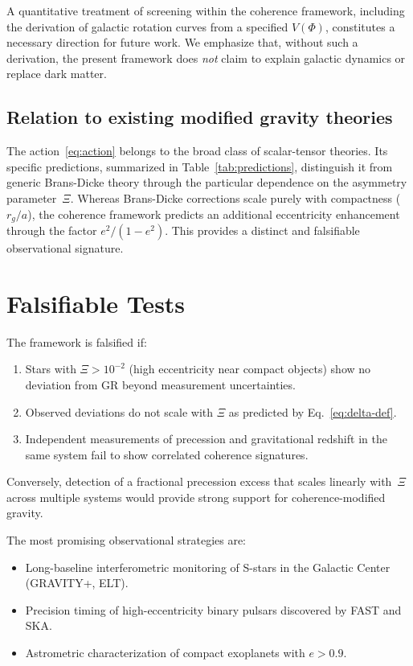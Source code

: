 \documentclass[showpacs,preprintnumbers,amsmath,amssymb,prd,longbibliography]{revtex4-2}
\begin{document}
A quantitative treatment of screening within the coherence
framework, including the derivation of galactic rotation
curves from a specified $V(\Phi)$, constitutes a necessary
direction for future work.
We emphasize that, without such a derivation, the present
framework does \emph{not} claim to explain galactic dynamics
or replace dark matter.

\subsection{Relation to existing modified gravity theories}

The action~\eqref{eq:action} belongs to the broad class
of scalar-tensor theories.
Its specific predictions, summarized in
Table~\ref{tab:predictions}, distinguish it from generic
Brans-Dicke theory through the particular dependence on the
asymmetry parameter~$\Xi$.
Whereas Brans-Dicke corrections scale purely with compactness
($r_g/a$), the coherence framework predicts an
additional eccentricity enhancement through the factor
$e^2/(1-e^2)$.
This provides a distinct and falsifiable observational signature.

\section{Falsifiable Tests}
\label{sec:falsification}

The framework is falsified if:
\begin{enumerate}
\item Stars with $\Xi > 10^{-2}$ (high eccentricity near
compact objects) show no deviation from GR beyond
measurement uncertainties.
\item Observed deviations do not scale with $\Xi$ as predicted
by Eq.~\eqref{eq:delta-def}.
\item Independent measurements of precession and gravitational
redshift in the same system fail to show correlated
coherence signatures.
\end{enumerate}

Conversely, detection of a fractional precession excess that
scales linearly with~$\Xi$ across multiple systems would
provide strong support for coherence-modified gravity.

The most promising observational strategies are:
\begin{itemize}
\item Long-baseline interferometric monitoring of S-stars in the
Galactic Center (GRAVITY+, ELT).
\item Precision timing of high-eccentricity binary pulsars
discovered by FAST and SKA.
\item Astrometric characterization of compact
exoplanets with $e > 0.9$.
\end{itemize}
\end{document}
